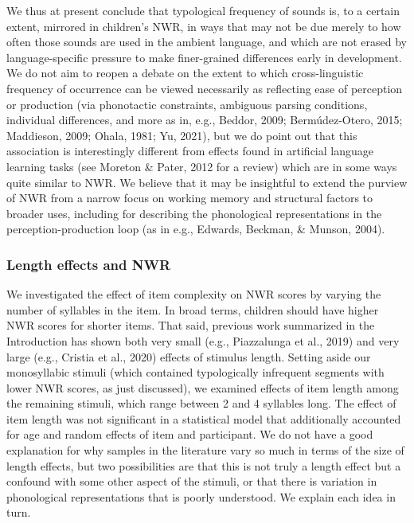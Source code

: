 \documentclass[
  american,
  ,man,floatsintext]{apa6}
\begin{document}
We thus at present conclude that typological frequency of sounds is, to a certain extent, mirrored in children's NWR, in ways that may not be due merely to how often those sounds are used in the ambient language, and which are not erased by language-specific pressure to make finer-grained differences early in development. We do not aim to reopen a debate on the extent to which cross-linguistic frequency of occurrence can be viewed necessarily as reflecting ease of perception or production (via phonotactic constraints, ambiguous parsing conditions, individual differences, and more as in, e.g., Beddor, 2009; Bermúdez-Otero, 2015; Maddieson, 2009; Ohala, 1981; Yu, 2021), but we do point out that this association is interestingly different from effects found in artificial language learning tasks (see Moreton \& Pater, 2012 for a review) which are in some ways quite similar to NWR. We believe that it may be insightful to extend the purview of NWR from a narrow focus on working memory and structural factors to broader uses, including for describing the phonological representations in the perception-production loop (as in e.g., Edwards, Beckman, \& Munson, 2004).

\hypertarget{length-effects-and-nwr}{%
\subsubsection{Length effects and NWR}\label{length-effects-and-nwr}}

We investigated the effect of item complexity on NWR scores by varying the number of syllables in the item. In broad terms, children should have higher NWR scores for shorter items. That said, previous work summarized in the Introduction has shown both very small (e.g., Piazzalunga et al., 2019) and very large (e.g., Cristia et al., 2020) effects of stimulus length. Setting aside our monosyllabic stimuli (which contained typologically infrequent segments with lower NWR scores, as just discussed), we examined effects of item length among the remaining stimuli, which range between 2 and 4 syllables long. The effect of item length was not significant in a statistical model that additionally accounted for age and random effects of item and participant. We do not have a good explanation for why samples in the literature vary so much in terms of the size of length effects, but two possibilities are that this is not truly a length effect but a confound with some other aspect of the stimuli, or that there is variation in phonological representations that is poorly understood. We explain each idea in turn.
\end{document}
